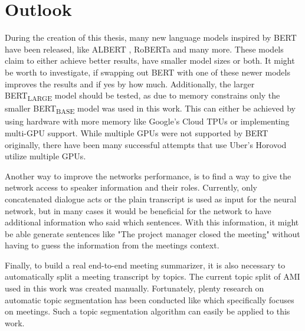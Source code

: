 \chapter{Outlook}\label{ch:outlook}

During the creation of this thesis, many new language models inspired by BERT have been released, like ALBERT \cite{1909.11942}, RoBERTa \cite{1907.11692} and many more.
These models claim to either achieve better results, have smaller model sizes or both.
It might be worth to investigate, if swapping out BERT with one of these newer models improves the results and if yes by how much.
Additionally, the larger BERT\textsubscript{LARGE} model should be tested, as due to memory constrains only the smaller BERT\textsubscript{BASE} model was used in this work.
This can either be achieved by using hardware with more memory like Google's Cloud TPUs or implementing multi-GPU support.
While multiple GPUs were not supported by BERT originally, there have been many successful attempts that use Uber's Horovod \cite{sergeev2018horovod} utilize multiple GPUs.

Another way to improve the networks performance, is to find a way to give the network access to speaker information and their roles.
Currently, only concatenated dialogue acts or the plain transcript is used as input for the neural network, but in many cases it would be beneficial for the network to have additional information who said which sentences.
With this information, it might be able generate sentences like "The project manager closed the meeting" without having to guess the information from the meetings context.

Finally, to build a real end-to-end meeting summarizer, it is also necessary to automatically split a meeting transcript by topics.
The current topic split of AMI used in this work was created manually.
Fortunately, plenty research on automatic topic segmentation has been conducted like \cite{10.3115/1075096.1075167} which specifically focuses on meetings.
Such a topic segmentation algorithm can easily be applied to this work.